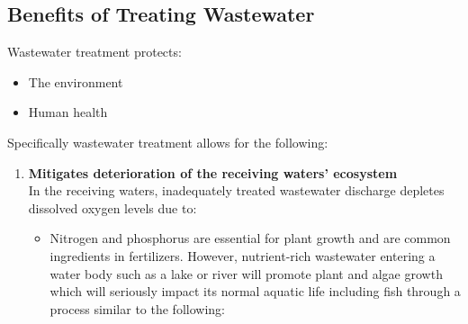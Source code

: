 \documentclass{article}
\begin{document}
\subsection{Benefits of Treating Wastewater}
Wastewater treatment protects:
\begin{itemize}
\item The environment
\item Human health
\end{itemize}

Specifically wastewater treatment allows for the following:

\begin{enumerate}
\item \textbf{Mitigates deterioration of the receiving waters' ecosystem }\\
In the receiving waters, inadequately treated wastewater discharge depletes dissolved oxygen levels due to:

\begin{itemize}

\item Nitrogen and phosphorus are essential for plant growth and are common ingredients in fertilizers. However, nutrient-rich wastewater entering a water body such as a lake or river will promote plant and algae growth which will seriously impact its normal aquatic life including fish through a process similar to the following:


\end{itemize}
\end{enumerate}
\end{document}
